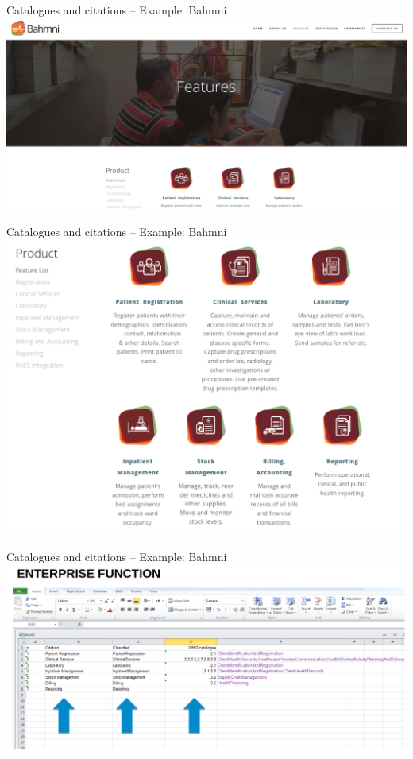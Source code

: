 \documentclass[aspectratio=1610,12pt]{beamer}
\begin{document}
\begin{frame}{Catalogues and citations -- Example: Bahmni}
  \includegraphics[width=\textwidth]{img/bahmni-example1.png}
\end{frame}

\begin{frame}{Catalogues and citations -- Example: Bahmni}
  \centering
  \includegraphics[height=.8\textheight]{img/bahmni-example2.png}
\end{frame}

\begin{frame}{Catalogues and citations -- Example: Bahmni}
  \includegraphics[width=\textwidth]{img/bahmni-table1.png}
\end{frame}
\end{document}
